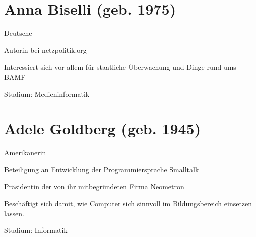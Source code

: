 \documentclass[a4paper,12pt]{report}
\begin{document}
\section*{Anna Biselli (geb. 1975)}
\begin{itemize*}
    \item Deutsche
    \item Autorin bei netzpolitik.org
    \item Interessiert sich vor allem für staatliche Überwachung und Dinge rund ums BAMF
    \item Studium: Medieninformatik
\end{itemize*}

\section*{Adele Goldberg (geb. 1945)}
\begin{itemize*}
    \item Amerikanerin
    \item Beteiligung an Entwicklung der Programmiersprache Smalltalk
    \item Präsidentin der von ihr mitbegründeten Firma Neometron
    \item Beschäftigt sich damit, wie Computer sich sinnvoll im Bildungsbereich einsetzen lassen.
    \item Studium: Informatik
\end{itemize*}



\end{document}
